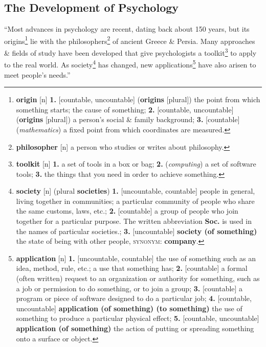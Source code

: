 \documentclass[oneside]{book}
\numberwithin{equation}{section}
\begin{document}
\subsection{The Development of Psychology}
``Most advances in psychology are recent, dating back about 150 years, but its origins\footnote{\textbf{origin} [n] \textbf{1.} [countable, uncountable] (\textbf{origins} [plural]) the point from which something starts; the cause of something; \textbf{2.} [countable, uncountable] (\textbf{origins} [plural]) a person's social \& family background; \textbf{3.} [countable] (\textit{mathematics}) a fixed point from which coordinates are measured.} lie with the philosophers\footnote{\textbf{philosopher} [n] a person who studies or writes about philosophy.} of ancient Greece \& Persia. Many approaches \& fields of study have been developed that give psychologists a toolkit\footnote{\textbf{toolkit} [n] \textbf{1.} a set of tools in a box or bag; \textbf{2.} (\textit{computing}) a set of software tools; \textbf{3.} the things that you need in order to achieve something.} to apply to the real world. As society\footnote{\textbf{society} [n] (plural \textbf{societies}) \textbf{1.} [uncountable, countable] people in general, living together in communities; a particular community of people who share the same customs, laws, etc.; \textbf{2.} [countable] a group of people who join together for a particular purpose. The written abbreviation \textbf{Soc.} is used in the names of particular societies.; \textbf{3.} [uncountable] \textbf{society (of something)} the state of being with other people, \textsc{synonym}: \textbf{company}.} has changed, new applications\footnote{\textbf{application} [n] \textbf{1.} [uncountable, countable] the use of something such as an idea, method, rule, etc.; a use that something has; \textbf{2.} [countable] a formal (often written) request to an organization or authority for something, such as a job or permission to do something, or to join a group; \textbf{3.} [countable] a program or piece of software designed to do a particular job; \textbf{4.} [countable, uncountable] \textbf{application (of something) (to something)} the use of something to produce a particular physical effect; \textbf{5.} [countable, uncountable] \textbf{application (of something)} the action of putting or spreading something onto a surface or object.} have also arisen to meet people's needs.''
\end{document}
